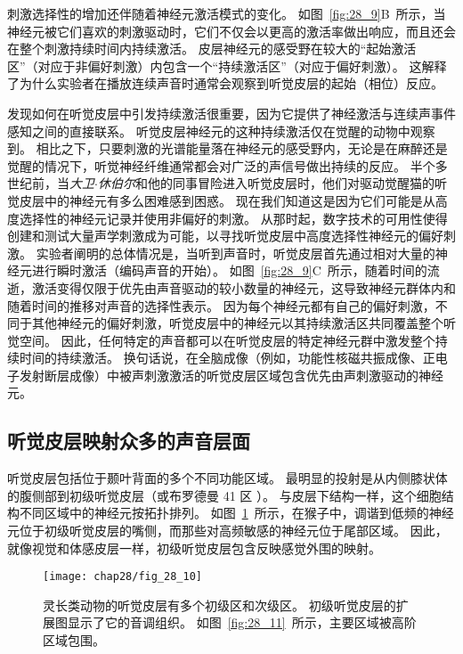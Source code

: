 刺激选择性的增加还伴随着神经元激活模式的变化。
如图~\ref{fig:28_9}B~所示，当神经元被它们喜欢的刺激驱动时，它们不仅会以更高的激活率做出响应，而且还会在整个刺激持续时间内持续激活。
皮层神经元的感受野在较大的“起始激活区”（对应于非偏好刺激）内包含一个“持续激活区”（对应于偏好刺激）。 
这解释了为什么实验者在播放连续声音时通常会观察到听觉皮层的起始（相位）反应。


发现如何在听觉皮层中引发持续激活很重要，因为它提供了神经激活与连续声事件感知之间的直接联系。
听觉皮层神经元的这种持续激活仅在觉醒的动物中观察到。
相比之下，只要刺激的光谱能量落在神经元的感受野内，无论是在麻醉还是觉醒的情况下，听觉神经纤维通常都会对广泛的声信号做出持续的反应。
半个多世纪前，当\textit{大卫$\cdot$休伯尔}和他的同事冒险进入听觉皮层时，他们对驱动觉醒猫的听觉皮层中的神经元有多么困难感到困惑。
现在我们知道这是因为它们可能是从高度选择性的神经元记录并使用非偏好的刺激。
从那时起，数字技术的可用性使得创建和测试大量声学刺激成为可能，以寻找听觉皮层中高度选择性神经元的偏好刺激。
实验者阐明的总体情况是，当听到声音时，听觉皮层首先通过相对大量的神经元进行瞬时激活（编码声音的开始）。
如图~\ref{fig:28_9}C~所示，随着时间的流逝，激活变得仅限于优先由声音驱动的较小数量的神经元，这导致神经元群体内和随着时间的推移对声音的选择性表示。
因为每个神经元都有自己的偏好刺激，不同于其他神经元的偏好刺激，听觉皮层中的神经元以其持续激活区共同覆盖整个听觉空间。
因此，任何特定的声音都可以在听觉皮层的特定神经元群中激发整个持续时间的持续激活。
换句话说，在全脑成像（例如，功能性核磁共振成像、正电子发射断层成像）中被声刺激激活的听觉皮层区域包含优先由声刺激驱动的神经元。



\subsection{听觉皮层映射众多的声音层面}

听觉皮层包括位于颞叶背面的多个不同功能区域。
最明显的投射是从内侧膝状体的腹侧部到初级听觉皮层（或布罗德曼 41 区 ）。
与皮层下结构一样，这个细胞结构不同区域中的神经元按拓扑排列。
如图~\ref{fig:28_10}~所示，在猴子中，调谐到低频的神经元位于初级听觉皮层的嘴侧，而那些对高频敏感的神经元位于尾部区域。
因此，就像视觉和体感皮层一样，初级听觉皮层包含反映感觉外围的映射。


\begin{figure}[htbp]
	\centering
	\texttt{[image: chap28/fig\_28\_10]}
	\caption{灵长类动物的听觉皮层有多个初级区和次级区。 
		初级听觉皮层的扩展图显示了它的音调组织。
		如图~\ref{fig:28_11}~所示，主要区域被高阶区域包围。}
	\label{fig:28_10}
\end{figure}


